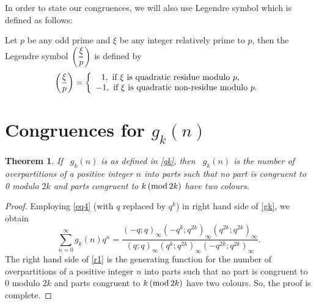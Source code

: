 \documentclass[12pt]{article}
\renewcommand{\(}{\left\(}
\renewcommand{\)}{\right\)}
\renewcommand{\[}{\left[}
\renewcommand{\]}{\right]}
\renewcommand{\pmod}[1]{\,(\textup{mod}\,#1)}
\numberwithin{equation}{section}
\theoremstyle{plain}
\newtheorem{theorem}{Theorem}[section]
\begin{document}
In order to state our congruences, we will also use Legendre symbol which is defined as follows:

Let $p$ be any odd prime and $\xi$ be any integer relatively prime to $p$, then the Legendre symbol $\left(\dfrac{\xi}{p}\right)$ is defined by  
 	\begin{equation*}
 	\left(\dfrac{\xi}{p}\right)
 	= \left\{
 	\begin{array}{cc}
 	\hspace{-.5cm}1,~\text{if $\xi$ is quadratic residue modulo $p$}, \\
 	-1,~\text{if $\xi$ is quadratic non-residue modulo $p$} .
 	\end{array}
 	\right.
 	\end{equation*}
 

\section{Congruences for $g_k(n)$}
\begin{theorem}
If~ $g_k(n)$ is as defined in \eqref{gk}, then~ $g_k(n)$ is the number of overpartitions of a positive integer $n$ into parts such that no part is congruent to 0 modulo $2k$ and parts congruent to $k\pmod{2k}$ have two colours.
\end{theorem}
\begin{proof}
Employing \eqref{eq4} (with $q$ replaced by $q^k$) in right hand side of \eqref{gk}, we obtain
\begin{equation}\label{r1}
\sum_{n=0}^{\infty}g_k(n)q^n=\dfrac{(-q;q)_\infty (-q^k;q^{2k})_\infty (q^{2k};q^{2k})_\infty}{(q;q)_\infty (q^k;q^{2k})_\infty(-q^{2k};q^{2k})_\infty}.
\end{equation}The right hand side of \eqref{r1} is the generating function for the number of overpartitions of a positive integer $n$ into parts such that no part is congruent to 0 modulo $2k$ and parts congruent to $k\pmod{2k}$ have two colours. So, the proof is complete.
\end{proof}
\end{document}

